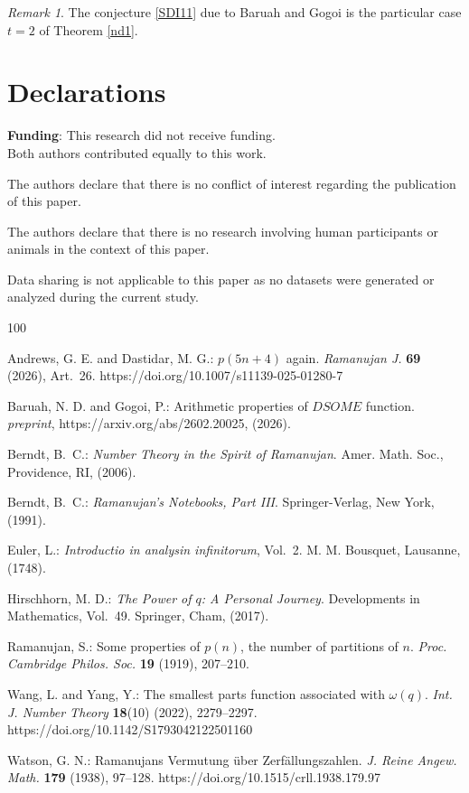 \documentclass[12pt]{article}
\numberwithin{equation}{section}
\theoremstyle{definition}
\theoremstyle{remark}
\newtheorem{remark}[theorem]{Remark}
\numberwithin{equation}{section}
\begin{document}
\begin{remark} The conjecture \eqref{SDI11} due to Baruah and Gogoi  is the particular case  $t=2$ of Theorem \ref{nd1}. \end{remark}


 \section*{\bf Declarations}
   
 \noindent\textbf{Funding}: This research did not receive funding.\\
  Both authors contributed equally to this work.
 
  The authors declare that there is no conflict of interest regarding the publication of this paper.
 
  The authors declare that there is no research involving human participants or animals in the context of this paper.	
 
  Data sharing is not applicable to this paper as no datasets were generated or analyzed during the current study.	

\begin{thebibliography}{100}

Andrews, G. E. and Dastidar, M. G.: $p(5n+4)$ again.
\textit{Ramanujan J.} \textbf{69} (2026), Art.~26.
https://doi.org/10.1007/s11139-025-01280-7

Baruah, N. D. and Gogoi, P.: Arithmetic properties of $DSOME$ function.
\textit{preprint}, https://arxiv.org/abs/2602.20025, (2026).

Berndt, B.~C.: \textit{Number Theory in the Spirit of Ramanujan}.
Amer. Math. Soc., Providence, RI, (2006).

Berndt, B.~C.: \textit{Ramanujan's Notebooks, Part III}.
Springer-Verlag, New York, (1991).

Euler, L.: \textit{Introductio in analysin infinitorum}, Vol.~2.
M. M. Bousquet, Lausanne, (1748).

Hirschhorn, M. D.: \textit{The Power of $q$: A Personal Journey}.
Developments in Mathematics, Vol.~49. Springer, Cham, (2017).

Ramanujan, S.: Some properties of $p(n)$, the number of partitions of $n$.
\textit{Proc. Cambridge Philos. Soc.} \textbf{19} (1919), 207--210.

Wang, L. and Yang, Y.: The smallest parts function associated with 
$\omega(q)$.
\textit{Int. J. Number Theory} \textbf{18}(10) (2022), 2279--2297.
https://doi.org/10.1142/S1793042122501160

Watson, G. N.: Ramanujans Vermutung \"{u}ber Zerf\"{a}llungszahlen.
\textit{J. Reine Angew. Math.} \textbf{179} (1938), 97--128.
https://doi.org/10.1515/crll.1938.179.97

\end{thebibliography}
\end{document}
